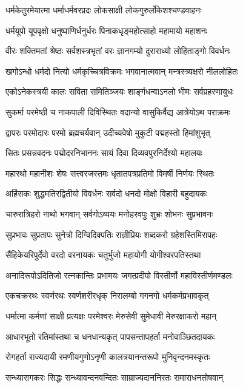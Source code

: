 \twolineshloka
{धर्मकेतुरमेयात्मा धर्माधर्मवरप्रदः}
{लोकसाक्षी लोकगुरुर्लोकेशश्चण्डवाहनः}%

\twolineshloka
{धर्मयूपो यूपवृक्षो धनुष्पाणिर्धनुर्धरः}
{पिनाकधृङ्महोत्साहो महामायो महाशनः}%

\twolineshloka
{वीरः शक्तिमतां श्रेष्ठः सर्वशस्त्रभृतां वरः}
{ज्ञानगम्यो दुराराध्यो लोहिताङ्गो विवर्धनः}%

\twolineshloka
{खगोऽन्धो धर्मदो नित्यो धर्मकृच्चित्रविक्रमः}
{भगवानात्मवान् मन्त्रस्त्र्यक्षरो नीललोहितः}%

\twolineshloka
{एकोऽनेकस्त्रयी कालः सविता समितिञ्जयः}
{शार्ङ्गधन्वाऽनलो भीमः सर्वप्रहरणायुधः}%

\twolineshloka
{सुकर्मा परमेष्ठी च नाकपाली दिविस्थितः}
{वदान्यो वासुकिर्वैद्य आत्रेयोऽथ पराक्रमः}%

\twolineshloka
{द्वापरः परमोदारः परमो ब्रह्मचर्यवान्}
{उदीच्यवेषो मुकुटी पद्महस्तो हिमांशुभृत्}%

\twolineshloka
{सितः प्रसन्नवदनः पद्मोदरनिभाननः}
{सायं दिवा दिव्यवपुरनिर्देश्यो महालयः}%

\twolineshloka
{महारथो महानीशः शेषः सत्त्वरजस्तमः}
{धृतातपत्रप्रतिमो विमर्षी निर्णयः स्थितः}%

\twolineshloka
{अहिंसकः शुद्धमतिरद्वितीयो विवर्धनः}
{सर्वदो धनदो मोक्षो विहारी बहुदायकः}%

\twolineshloka
{चारुरात्रिहरो नाथो भगवान् सर्वगोऽव्ययः}
{मनोहरवपुः शुभ्रः शोभनः सुप्रभावनः}%

\twolineshloka
{सुप्रभावः सुप्रतापः सुनेत्रो दिग्विदिक्पतिः}
{राज्ञीप्रियः शब्दकरो ग्रहेशस्तिमिरापहः}%

\twolineshloka
{सैंहिकेयरिपुर्देवो वरदो वरनायकः}
{चतुर्भुजो महायोगी योगीश्वरपतिस्तथा}%

\twolineshloka
{अनादिरूपोऽदितिजो रत्नकान्तिः प्रभामयः}
{जगत्प्रदीपो विस्तीर्णो महाविस्तीर्णमण्डलः}%

\twolineshloka
{एकचक्ररथः स्वर्णरथः स्वर्णशरीरधृक्}
{निरालम्बो गगनगो धर्मकर्मप्रभावकृत्}%

\twolineshloka
{धर्मात्मा कर्मणां  साक्षी प्रत्यक्षः परमेश्वरः}
{मेरुसेवी सुमेधावी मेरुरक्षाकरो महान्}%

\twolineshloka
{आधारभूतो रतिमांस्तथा च धनधान्यकृत्}
{पापसन्तापहर्ता मनोवाञ्छितदायकः}%

\twolineshloka
{रोगहर्ता राज्यदायी रमणीयगुणोऽनृणी}
{कालत्रयानन्तरूपो मुनिवृन्दनमस्कृतः}%

\twolineshloka
{सन्ध्यारागकरः सिद्धः सन्ध्यावन्दनवन्दितः}
{साम्राज्यदाननिरतः समाराधनतोषवान्}%

